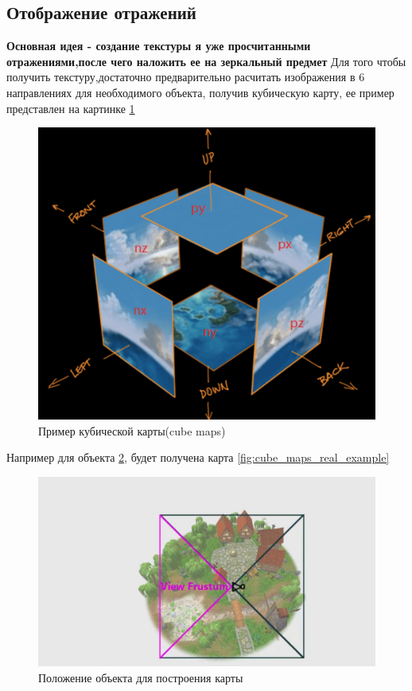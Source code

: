 \documentclass[a4paper,14pt, unknownkeysallowed]{extreport}
\begin{document}
\subsection{Отображение отражений}
\textbf{Основная идея - создание текстуры я уже просчитанными отражениями,после чего наложить ее на зеркальный предмет} \newline
Для того чтобы получить текстуру,достаточно предварительно расчитать изображения в 6 направлениях для необходимого объекта, получив кубическую карту, ее пример представлен на картинке \ref{fig:cube_maps}
\begin{figure}[h]
	\centering
	\includegraphics[scale=0.4]{cube_maps}
	\caption{Пример кубической карты(cube maps)}
	\label{fig:cube_maps}
\end{figure}
\newline
Например для объекта \ref{fig:cube_maps_real}, будет получена карта \ref{fig:cube_maps_real_example}


\begin{figure}[h]
	\centering
	\includegraphics[scale=0.4]{cube_maps_real}
	\caption{Положение объекта для построения карты}
	\label{fig:cube_maps_real}
\end{figure}
\end{document}
